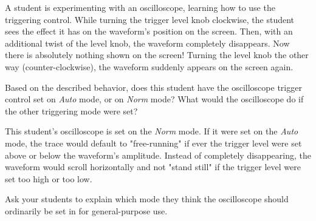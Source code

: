

A student is experimenting with an oscilloscope, learning how to use the triggering control.  While turning the trigger level knob clockwise, the student sees the effect it has on the waveform's position on the screen.  Then, with an additional twist of the level knob, the waveform completely disappears.  Now there is absolutely nothing shown on the screen!  Turning the level knob the other way (counter-clockwise), the waveform suddenly appears on the screen again.

Based on the described behavior, does this student have the oscilloscope trigger control set on {\it Auto} mode, or on {\it Norm} mode?  What would the oscilloscope do if the other triggering mode were set?







This student's oscilloscope is set on the {\it Norm} mode.  If it were set on the {\it Auto} mode, the trace would default to "free-running" if ever the trigger level were set above or below the waveform's amplitude.  Instead of completely disappearing, the waveform would scroll horizontally and not "stand still" if the trigger level were set too high or too low.







Ask your students to explain which mode they think the oscilloscope should ordinarily be set in for general-purpose use.




